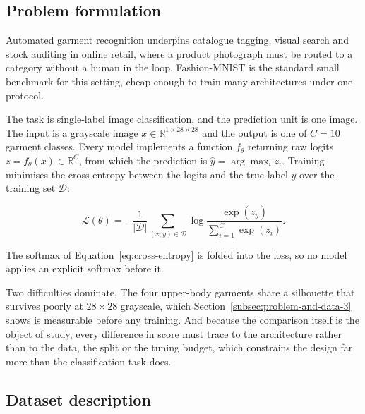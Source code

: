 
\subsection{Problem formulation}
\label{subsec:problem-and-data-1}

Automated garment recognition underpins catalogue tagging, visual search and stock auditing in
online retail, where a product photograph must be routed to a category without a human in the
loop. Fashion-MNIST \cite{xiao2017fashion} is the standard small benchmark for this setting,
cheap enough to train many architectures under one protocol.

The task is single-label image classification, and the prediction unit is one image. The input is
a grayscale image $x \in \mathbb{R}^{1 \times 28 \times 28}$ and the output is one of $C = 10$
garment classes. Every model implements a function $f_\theta$ returning raw logits
$z = f_\theta(x) \in \mathbb{R}^{C}$, from which the prediction is
$\hat{y} = \arg\max_{i} z_i$. Training minimises the cross-entropy between the logits and the
true label $y$ over the training set $\mathcal{D}$:

\begin{equation}
    \mathcal{L}(\theta) = -\frac{1}{|\mathcal{D}|} \sum_{(x, y) \in \mathcal{D}}
    \log \frac{\exp(z_y)}{\sum_{i=1}^{C} \exp(z_i)}.
    \label{eq:cross-entropy}
\end{equation}

The softmax of Equation~\ref{eq:cross-entropy} is folded into the loss, so no model applies an
explicit softmax before it.

Two difficulties dominate. The four upper-body garments share a silhouette that survives poorly
at $28 \times 28$ grayscale, which Section~\ref{subsec:problem-and-data-3} shows is measurable
before any training. And because the comparison itself is the object of study, every difference
in score must trace to the architecture rather than to the data, the split or the tuning budget,
which constrains the design far more than the classification task does.

\subsection{Dataset description}
\label{subsec:problem-and-data-2}

